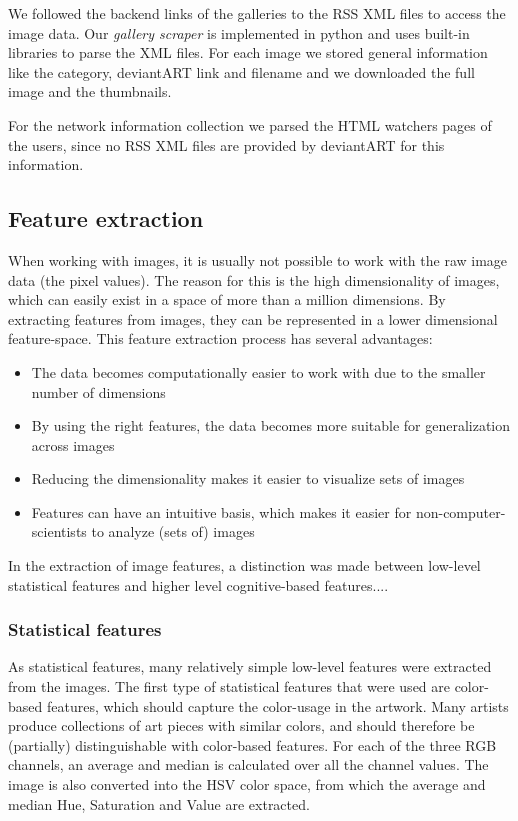 We followed the backend links of the galleries to the RSS XML files to access
the image data. Our \textit{gallery scraper} is implemented in python and uses
built-in libraries to parse the XML files. For each image we stored general 
information like the category, deviantART link and filename and we downloaded
the full image and the thumbnails.

For the network information collection we parsed the HTML watchers pages
of the users, since no RSS XML files are provided by deviantART for this
information.

\subsection{Feature extraction}
When working with images, it is usually not possible to work with the raw image data (the pixel values). The reason for this is the high dimensionality of images, which can easily exist in a space of more than a million dimensions. By extracting features from images, they can be represented in a lower dimensional feature-space.  This feature extraction process has several advantages:
\begin{itemize}
\item The data becomes computationally easier to work with due to the smaller number of dimensions
\item By using the right features, the data becomes more suitable for generalization across images
\item Reducing the dimensionality makes it easier to visualize sets of images
\item Features can have an intuitive basis, which makes it easier for non-computer-scientists to analyze (sets of) images
\end{itemize}

In the extraction of image features, a distinction was made between low-level statistical features and higher level cognitive-based features....

\subsubsection{Statistical features}
As statistical features, many relatively simple low-level features were extracted from the images.
The first type of statistical features that were used are color-based features, which should capture the color-usage in the artwork. Many artists produce collections of art pieces with similar colors, and should therefore be (partially) distinguishable with color-based features. For each of the three RGB channels, an average and median is calculated over all the channel values. The image is also converted into the HSV color space, from which the average and median Hue, Saturation and Value are extracted.  

